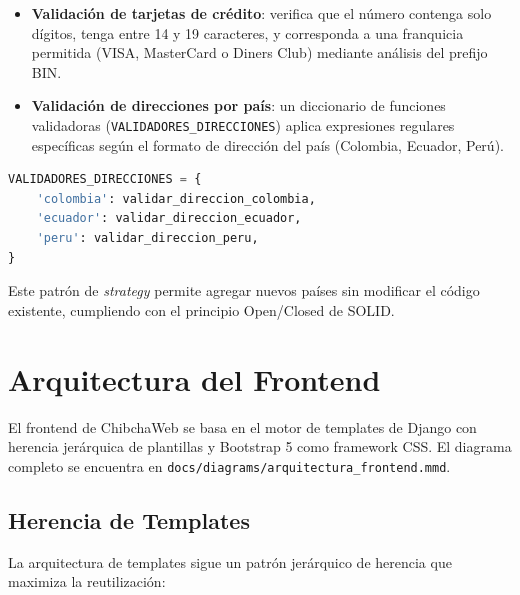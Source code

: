 \documentclass[12pt, a4paper]{article}
\begin{document}
\begin{itemize}
    \item \textbf{Validación de tarjetas de crédito}: verifica que el número contenga solo dígitos, tenga entre 14 y 19 caracteres, y corresponda a una franquicia permitida (VISA, MasterCard o Diners Club) mediante análisis del prefijo BIN.
    \item \textbf{Validación de direcciones por país}: un diccionario de funciones validadoras (\texttt{VALIDADORES\_DIRECCIONES}) aplica expresiones regulares específicas según el formato de dirección del país (Colombia, Ecuador, Perú).
\end{itemize}

\begin{lstlisting}[language=Python, caption={Validadores de direcciones por país}]
VALIDADORES_DIRECCIONES = {
    'colombia': validar_direccion_colombia,
    'ecuador': validar_direccion_ecuador,
    'peru': validar_direccion_peru,
}
\end{lstlisting}

Este patrón de \textit{strategy} permite agregar nuevos países sin modificar el código existente, cumpliendo con el principio Open/Closed de SOLID.

\section{Arquitectura del Frontend}
\label{sec:arq-frontend}

El frontend de ChibchaWeb se basa en el motor de templates de Django con herencia jerárquica de plantillas y Bootstrap 5 como framework CSS. El diagrama completo se encuentra en \texttt{docs/diagrams/arquitectura\_frontend.mmd}.

\subsection{Herencia de Templates}

La arquitectura de templates sigue un patrón jerárquico de herencia que maximiza la reutilización:
\end{document}

